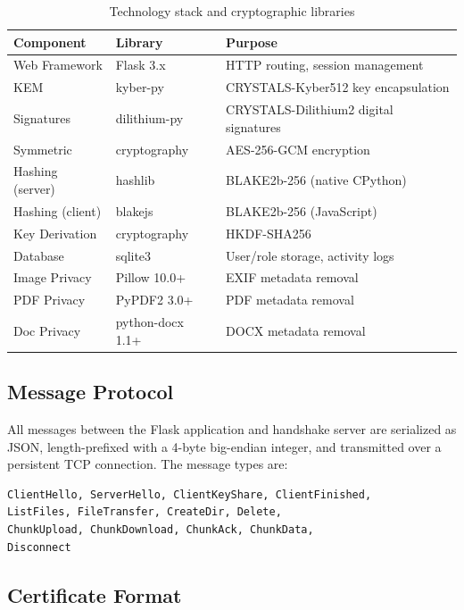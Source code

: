 \documentclass[12pt, a4paper]{article}
\begin{document}
\begin{table}[H]
    \centering
    \caption{Technology stack and cryptographic libraries}
    \label{tab:stack}
    \begin{tabularx}{\textwidth}{l l X}
        \toprule
        \textbf{Component} & \textbf{Library} & \textbf{Purpose} \\
        \midrule
        Web Framework & Flask 3.x & HTTP routing, session management \\
        KEM & kyber-py & CRYSTALS-Kyber512 key encapsulation \\
        Signatures & dilithium-py & CRYSTALS-Dilithium2 digital signatures \\
        Symmetric & cryptography & AES-256-GCM encryption \\
        Hashing (server) & hashlib & BLAKE2b-256 (native CPython) \\
        Hashing (client) & blakejs & BLAKE2b-256 (JavaScript) \\
        Key Derivation & cryptography & HKDF-SHA256 \\
        Database & sqlite3 & User/role storage, activity logs \\
        Image Privacy & Pillow 10.0+ & EXIF metadata removal \\
        PDF Privacy & PyPDF2 3.0+ & PDF metadata removal \\
        Doc Privacy & python-docx 1.1+ & DOCX metadata removal \\
        \bottomrule
    \end{tabularx}
\end{table}

\subsection{Message Protocol}

All messages between the Flask application and handshake server are serialized as JSON, length-prefixed with a 4-byte big-endian integer, and transmitted over a persistent TCP connection. The message types are:

\begin{lstlisting}[language={}, caption={Supported message types}, label={lst:messages}]
ClientHello, ServerHello, ClientKeyShare, ClientFinished,
ListFiles, FileTransfer, CreateDir, Delete,
ChunkUpload, ChunkDownload, ChunkAck, ChunkData,
Disconnect
\end{lstlisting}

\subsection{Certificate Format}
\end{document}
